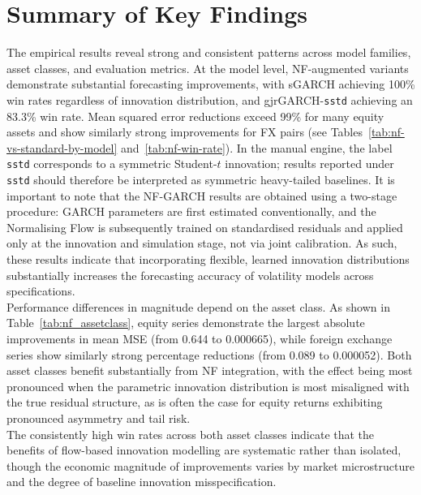\documentclass[oneside,12pt]{CUEDthesisPSnPDF}
\begin{document}
\section{Summary of Key Findings}
\label{sec:key_findings}
\noindent
The empirical results reveal strong and consistent patterns across model families, asset classes, and evaluation metrics. At the model level, NF-augmented variants demonstrate substantial forecasting improvements, with sGARCH achieving 100\% win rates regardless of innovation distribution, and gjrGARCH-\texttt{sstd} achieving an 83.3\% win rate. Mean squared error reductions exceed 99\% for many equity assets and show similarly strong improvements for FX pairs (see Tables~\ref{tab:nf-vs-standard-by-model} and~\ref{tab:nf-win-rate}). In the manual engine, the label \texttt{sstd} corresponds to a symmetric Student-$t$ innovation; results reported under \texttt{sstd} should therefore be interpreted as symmetric heavy-tailed baselines. It is important to note that the NF-GARCH results are obtained using a two-stage procedure: GARCH parameters are first estimated conventionally, and the Normalising Flow is subsequently trained on standardised residuals and applied only at the innovation and simulation stage, not via joint calibration. As such, these results indicate that incorporating flexible, learned innovation distributions substantially increases the forecasting accuracy of volatility models across specifications.\\

\medskip
\noindent
Performance differences in magnitude depend on the asset class. As shown in Table~\ref{tab:nf_assetclass}, equity series demonstrate the largest absolute improvements in mean MSE (from 0.644 to 0.000665), while foreign exchange series show similarly strong percentage reductions (from 0.089 to 0.000052). Both asset classes benefit substantially from NF integration, with the effect being most pronounced when the parametric innovation distribution is most misaligned with the true residual structure, as is often the case for equity returns exhibiting pronounced asymmetry and tail risk.\\

The consistently high win rates across both asset classes indicate that the benefits of flow-based innovation modelling are systematic rather than isolated, though the economic magnitude of improvements varies by market microstructure and the degree of baseline innovation misspecification.\\
\end{document}
